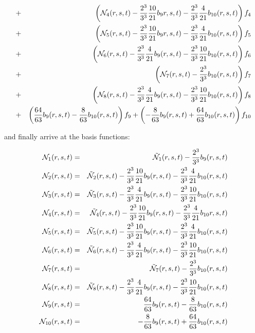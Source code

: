 \begin{eqnarray}
&+& \left( {\mathcal{N}}_4(r,s,t) -\frac{2^3}{3^3}\frac{10}{21} b_{9}r,s,t) -\frac{2^3}{3^3}\frac{4}{21} b_{10}(r,s,t)\right)f_4 \nonumber\\ 
&+&\left( {\mathcal{N}}_5(r,s,t)- \frac{2^3}{3^3}\frac{10}{21} b_{9}r,s,t) -\frac{2^3}{3^3}\frac{4}{21} b_{10}(r,s,t) \right) f_5 \nonumber\\
&+&\left( {\mathcal{N}}_6(r,s,t) -\frac{2^3}{3^3}\frac{4}{21} b_9(r,s,t) -\frac{2^3}{3^3}\frac{10}{21} b_{10}(r,s,t) \right) f_6 \nonumber\\
&+&\left( {\mathcal{N}}_7(r,s,t) - \frac{2^3}{3^3}b_{10}(r,s,t) \right) f_7 \nonumber\\
&+&\left( {\mathcal{N}}_8(r,s,t) -\frac{2^3}{3^3}\frac{4}{21} b_9(r,s,t) -\frac{2^3}{3^3}\frac{10}{21} b_{10}(r,s,t) \right) f_8 \nonumber\\
&+& \left(  \frac{64}{63}b_9(r,s,t) -\frac{8}{63} b_{10}(r,s,t) \right) f_9 
+ \left( -\frac{8}{63} b_{9}(r,s,t)  + \frac{64}{63}b_{10}(r,s,t) \right) f_{10} 
\end{eqnarray}

and finally arrive at the basis functions:
\begin{mdframed}[backgroundcolor=blue!5]
\begin{eqnarray}
{\mathcal{N}}_1(r,s,t)    &=&  \tilde{{\mathcal{N}}}_1(r,s,t) - \frac{2^3}{3^3}b_9(r,s,t)      \nonumber\\
{\mathcal{N}}_2(r,s,t)    &=&  \tilde{{\mathcal{N}}}_2(r,s,t) - \frac{2^3}{3^3}\frac{10}{21} b_9(r,s,t) - \frac{2^3}{3^3}\frac{4}{21} b_{10}(r,s,t)      \nonumber\\
{\mathcal{N}}_3(r,s,t)    &=&  \tilde{{\mathcal{N}}}_3(r,s,t)  -\frac{2^3}{3^3}\frac{4}{21} b_9(r,s,t) -\frac{2^3}{3^3}\frac{10}{21} b_{10}(r,s,t)      \nonumber\\
{\mathcal{N}}_4(r,s,t)    &=&  \tilde{{\mathcal{N}}}_4(r,s,t) -\frac{2^3}{3^3}\frac{10}{21} b_{9}(r,s,t) -\frac{2^3}{3^3}\frac{4}{21} b_{10}r,s,t)      \nonumber\\
{\mathcal{N}}_5(r,s,t)    &=&  \tilde{{\mathcal{N}}}_5(r,s,t)- \frac{2^3}{3^3}\frac{10}{21} b_{9}(r,s,t) -\frac{2^3}{3^3}\frac{4}{21} b_{10}(r,s,t)      \nonumber\\
{\mathcal{N}}_6(r,s,t)    &=&  \tilde{{\mathcal{N}}}_6(r,s,t) -\frac{2^3}{3^3}\frac{4}{21} b_9(r,s,t) -\frac{2^3}{3^3}\frac{10}{21} b_{10}(r,s,t)      \nonumber\\
{\mathcal{N}}_7(r,s,t)    &=&  \tilde{{\mathcal{N}}}_7(r,s,t) - \frac{2^3}{3^3}b_{10}(r,s,t)      \nonumber\\
{\mathcal{N}}_8(r,s,t)    &=&  \tilde{{\mathcal{N}}}_8(r,s,t) -\frac{2^3}{3^3}\frac{4}{21} b_9(r,s,t) -\frac{2^3}{3^3}\frac{10}{21} b_{10}(r,s,t)      \nonumber\\
{\mathcal{N}}_9(r,s,t)    &=&  \frac{64}{63}b_9(r,s,t) -\frac{8}{63} b_{10}(r,s,t)      \nonumber\\
{\mathcal{N}}_{10}(r,s,t) &=&  -\frac{8}{63} b_{9}(r,s,t)  + \frac{64}{63}b_{10}(r,s,t)       \nonumber
\end{eqnarray}
\end{mdframed}

